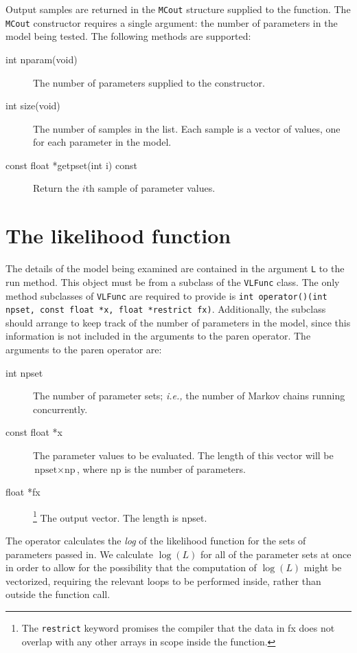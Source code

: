 \documentclass[11pt]{article}
\begin{document}
Output samples are returned in the \texttt{MCout} structure supplied
to the function.  The \texttt{MCout} constructor requires a single
argument:  the number of parameters in the model being tested.  The
following methods are supported:
\begin{description}
\item[int nparam(void)] The number of parameters supplied to the
  constructor.
\item[int size(void)] The number of samples in the list.  Each sample
  is a vector of values, one for each parameter in the model.
\item[const float *getpset(int i) const] Return the $i$th sample of
  parameter values.
\end{description}

\section{The likelihood function}
\label{sec:vlfunc}
The details of the model being examined are contained in the argument
\texttt{L} to the run method.  This object must be from a subclass of
the \texttt{VLFunc} class.  The only method subclasses of
\texttt{VLFunc} are required to provide is
\verb=int operator()(int npset, const float *x, float *restrict fx)=.
Additionally, the subclass should arrange to keep track of the number
of parameters in the model, since this information is not included in
the arguments to the paren operator.  The arguments to the paren
operator are:
\begin{description}
\item[int npset] The number of parameter sets; \emph{i.e.,} the number
  of Markov chains running concurrently.
\item[const float *x] The parameter values to be evaluated.  The
  length of this vector will be $\text{npset} \times \text{np}$, where
  np is the number of parameters.
\item[float *fx]\footnote{The \texttt{restrict} keyword promises the
  compiler that the data in fx does not overlap with any other arrays
  in scope inside the function.}  The output vector.  The length is npset.
\end{description}

The operator calculates the \emph{log} of the likelihood function for
the sets of parameters passed in.  We calculate $\log(L)$ for all of
the parameter sets at once in order to allow for the possibility that
the computation of $\log(L)$ might be vectorized, requiring the
relevant loops to be performed inside, rather than outside the
function call.
\end{document}
